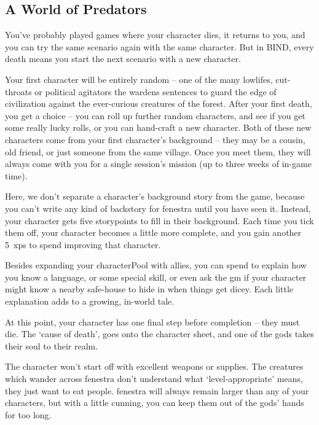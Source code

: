 \begin{multicols}{2}

\subsection*{A World of Predators}

You've probably played games where your character dies, it returns to you, and you can try the same scenario again with the same character.
But in BIND, every death means you start the next scenario with a new character.

Your first character will be entirely random -- one of the many lowlifes, cut-throats or political agitators the \glspl{warden} sentences to guard the \gls{edge} of civilization against the ever-curious creatures of the forest.
After your first death, you get a choice -- you can roll up further random characters, and see if you get some really lucky rolls, or you can hand-craft a new character.
Both of these new characters come from your first character's background -- they may be a cousin, old friend, or just someone from the same village.
Once you meet them, they will always come with you for a single session's mission (up to three weeks of in-game time).

Here, we don't separate a character's background story from the game, because you can't write any kind of backstory for \gls{fenestra} until you have seen it.
Instead, your character gets five \glspl{storypoint} to fill in their background.
Each time you tick them off, your character becomes a little more complete, and you gain another 5~\glspl{xp} to spend improving that character.

Besides expanding your \gls{characterPool} with allies, you can spend  to explain how you know a language, or some special skill, or even ask the \gls{gm} if your character might know a nearby safe-house to hide in when things get dicey.
Each little explanation adds to a growing, in-world tale.

At this point, your character has one final step before completion -- they must die.
The `cause of death', goes onto the character sheet, and one of the gods takes their soul to their realm.

The character won't start off with excellent weapons or supplies.
The creatures which wander across \gls{fenestra} don't understand what `level-appropriate' means, they just want to eat people.
\Gls{fenestra} will always remain larger than any of your characters, but with a little cunning, you can keep them out of the gods' hands for too long.


\end{multicols}
